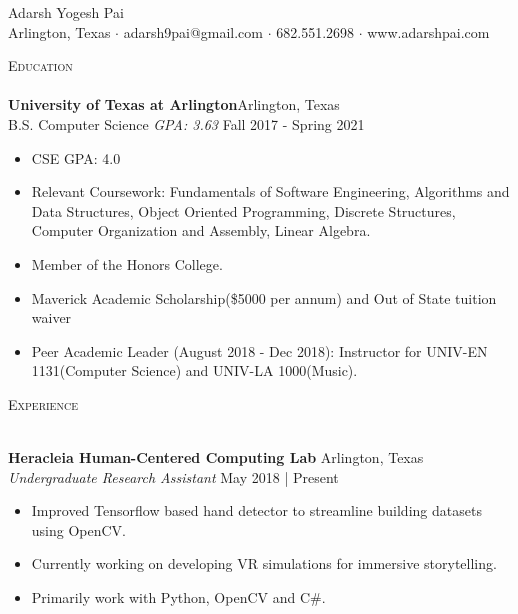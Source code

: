 \documentclass[a4paper]{article}
\newcommand{\lineunder} {
    \vspace*{-8pt} \\
    \hspace*{-18pt} \hrulefill \\
}
\newcommand{\header} [1] {
    {\hspace*{-18pt}\vspace*{6pt} \textsc{#1}}
    \vspace*{-6pt} \lineunder
}
\begin{document}
\vspace*{-40pt}

    


\vspace*{-10pt}
\begin{center}
	{\Huge{Adarsh Yogesh Pai}}\\
	Arlington, Texas $\cdot$ adarsh9pai@gmail.com $\cdot$ 682.551.2698 $\cdot$ www.adarshpai.com\\
\end{center}

\header{Education}
\textbf{University of Texas at Arlington}\hfill Arlington, Texas\\
B.S. Computer Science \textit{GPA: 3.63} \hfill Fall 2017 - Spring 2021\\

\begin{itemize} \itemsep 1pt
	\item CSE GPA: 4.0
	\item Relevant Coursework: Fundamentals of Software Engineering, Algorithms and Data Structures, Object Oriented Programming, Discrete Structures, Computer Organization and Assembly, Linear Algebra.
	\item Member of the Honors College.
	\item Maverick Academic Scholarship(\$5000 per annum) and Out of State tuition waiver
         \item Peer Academic Leader (August 2018 - Dec 2018): Instructor for UNIV-EN 1131(Computer Science) and UNIV-LA 1000(Music).
\end{itemize}
\vspace{2mm}
\header{Experience}
\vspace{1mm}

\textbf{Heracleia Human-Centered Computing Lab} \hfill Arlington, Texas\\
\textit{Undergraduate Research Assistant} \hfill May 2018 | Present\\
\vspace{-1mm}
\begin{itemize} \itemsep 1pt
	\item Improved Tensorflow based hand detector to streamline building datasets using OpenCV.
	\item Currently working on developing VR simulations for immersive storytelling.
	\item Primarily work with Python, OpenCV and C\#.
\end{itemize}
\end{document}
